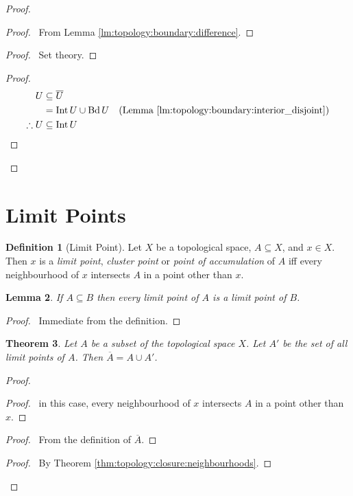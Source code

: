 \documentclass{report}
\let\qed\relax
\newtheorem{lm}{Lemma}[section]
\newtheorem{thm}[lm]{Theorem}
\theoremstyle{definition}
\newtheorem{df}[lm]{Definition}
\newcommand{\Int}{\ensuremath{\operatorname{Int}}}
\newcommand{\Bd}{\ensuremath{\operatorname{Bd}}}
\begin{document}
  \begin{proof}
    \pf
    \begin{proof}
      \pf\ From Lemma \ref{lm:topology:boundary:difference}.
    \end{proof}
    \begin{proof}
      \pf\ Set theory.
    \end{proof}
    \begin{proof}
      \pf
      \begin{align*}
        U & \subseteq \overline{U} \\
        & = \Int U \cup \Bd U & (\text{Lemma
          \ref{lm:topology:boundary:interior_disjoint}}) \\
        \therefore U & \subseteq \Int U
      \end{align*}
    \end{proof}
    \qed
  \end{proof}

  \section{Limit Points}

  \begin{df}[Limit Point]
    Let $X$ be a topological space, $A \subseteq X$, and $x \in X$. Then $x$ is
    a
    \emph{limit point}, \emph{cluster point} or \emph{point of accumulation} of
    $A$ iff every neighbourhood of $x$ intersects $A$ in a point other than $x$.
  \end{df}

  \begin{lm}
    \label{lm:topology:limit_point:subset}
    If $A \subseteq B$ then every limit point of $A$ is a limit point of $B$.
  \end{lm}

  \begin{proof}
    \pf\ Immediate from the definition. \qed
  \end{proof}

  \begin{thm}
    Let $A$ be a subset of the topological space $X$. Let $A'$ be the set of
    all
    limit points of $A$. Then $\overline{A} = A \cup A'$.
  \end{thm}

  \begin{proof}
    \pf
    \begin{proof}
      \pf\ in this case, every neighbourhood of $x$ intersects $A$ in a point
      other than $x$.
    \end{proof}
    \begin{proof}
      \pf\ From the definition of $\overline{A}$.
    \end{proof}
    \begin{proof}
      \pf\ By Theorem \ref{thm:topology:closure:neighbourhoods}.
    \end{proof}
    \qed
  \end{proof}
\end{document}

